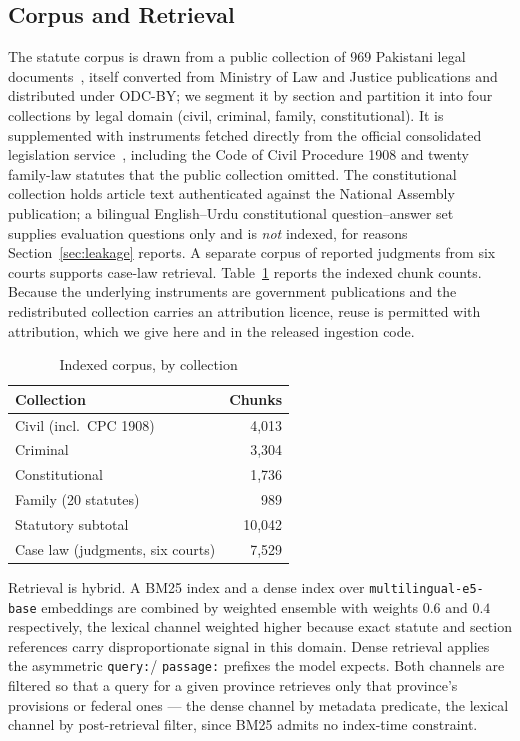 \documentclass[conference]{IEEEtran}
\begin{document}
\subsection{Corpus and Retrieval}
\label{sec:retrieval}
The statute corpus is drawn from a public collection of 969 Pakistani legal
documents~\cite{paklaws}, itself converted from Ministry of Law and Justice
publications and distributed under ODC-BY; we segment it by section and
partition it into four collections by legal domain (civil, criminal, family,
constitutional). It is supplemented with instruments fetched directly from the
official consolidated legislation service~\cite{pakistancode}, including the
Code of Civil Procedure 1908 and twenty family-law statutes that the public
collection omitted. The constitutional collection holds article text
authenticated against the National Assembly publication; a bilingual
English--Urdu constitutional question--answer set~\cite{legaluqa} supplies
evaluation questions only and is \emph{not} indexed, for reasons
Section~\ref{sec:leakage} reports. A separate corpus of reported judgments
from six courts supports case-law retrieval. Table~\ref{tab:corpus} reports the
indexed chunk counts. Because the underlying instruments are government
publications and the redistributed collection carries an attribution licence,
reuse is permitted with attribution, which we give here and in the released
ingestion code.

\begin{table}[t]
\caption{Indexed corpus, by collection}
\label{tab:corpus}
\centering
\begin{tabular}{lr}
\toprule
\textbf{Collection} & \textbf{Chunks} \\
\midrule
Civil (incl.\ CPC 1908)          & 4{,}013 \\
Criminal                         & 3{,}304 \\
Constitutional                   & 1{,}736 \\
Family (20 statutes)             & 989 \\
\midrule
Statutory subtotal               & 10{,}042 \\
Case law (judgments, six courts) & 7{,}529 \\
\bottomrule
\end{tabular}
\end{table}

Retrieval is hybrid. A BM25 index and a dense index over
\texttt{multilingual-e5-base} embeddings are combined by weighted ensemble with
weights $0.6$ and $0.4$ respectively, the lexical channel weighted higher
because exact statute and section references carry disproportionate signal in
this domain. Dense retrieval applies the asymmetric \texttt{query:}/
\texttt{passage:} prefixes the model expects. Both channels are filtered so that
a query for a given province retrieves only that province's provisions or
federal ones --- the dense channel by metadata predicate, the lexical channel by
post-retrieval filter, since BM25 admits no index-time constraint.
\end{document}
